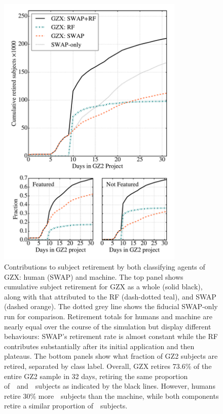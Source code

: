 \begin{figure}[t!]
\includegraphics[width=3.5in]{Figures/human_machine/f8.pdf}
\caption[Individual contributions of human and machine to galaxy classification]{Contributions to subject retirement by both classifying agents of GZX: human (SWAP) and machine. The top panel shows cumulative subject retirement for GZX as a whole (solid black), along with that attributed to the RF (dash-dotted teal), and SWAP (dashed orange). The dotted grey line shows the fiducial SWAP-only run for comparison. Retirement totals for humans and machine are nearly equal over the course of the simulation but display different behaviours: SWAP's retirement rate is almost constant while the RF contributes substantially after its initial application and then plateaus.  The bottom panels show what fraction of GZ2 subjects are retired, separated by class label. Overall, GZX retires 73.6\% of the entire GZ2 sample in 32 days, retiring the same proportion of~\feat~and~\notfeat~subjects as indicated by the black lines. However, humans retire 30\% more~\feat~subjects than the machine, while both components retire a similar proportion of~\notfeat~subjects. \label{fig: gzx components}}
\end{figure}



